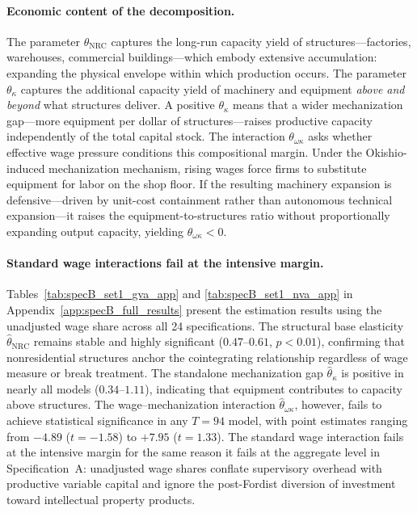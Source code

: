\paragraph{Economic content of the decomposition.}
The parameter $\theta_{\text{NRC}}$ captures the long-run capacity yield of structures---factories, warehouses, commercial buildings---which embody extensive accumulation: expanding the physical envelope within which production occurs. The parameter $\theta_\kappa$ captures the additional capacity yield of machinery and equipment \emph{above and beyond} what structures deliver. A positive $\theta_\kappa$ means that a wider mechanization gap---more equipment per dollar of structures---raises productive capacity independently of the total capital stock. The interaction $\theta_{\omega\kappa}$ asks whether effective wage pressure conditions this compositional margin. Under the Okishio-induced mechanization mechanism, rising wages force firms to substitute equipment for labor on the shop floor. If the resulting machinery expansion is defensive---driven by unit-cost containment rather than autonomous technical expansion---it raises the equipment-to-structures ratio without proportionally expanding output capacity, yielding $\theta_{\omega\kappa} < 0$.

\paragraph{Standard wage interactions fail at the intensive margin.}
Tables~\ref{tab:specB_set1_gva_app} and \ref{tab:specB_set1_nva_app} in Appendix~\ref{app:specB_full_results} present the estimation results using the unadjusted wage share across all 24 specifications. The structural base elasticity $\hat{\theta}_{\text{NRC}}$ remains stable and highly significant ($0.47$--$0.61$, $p < 0.01$), confirming that nonresidential structures anchor the cointegrating relationship regardless of wage measure or break treatment. The standalone mechanization gap $\hat{\theta}_\kappa$ is positive in nearly all models ($0.34$--$1.11$), indicating that equipment contributes to capacity above structures. The wage--mechanization interaction $\hat{\theta}_{\omega\kappa}$, however, fails to achieve statistical significance in any $T = 94$ model, with point estimates ranging from $-4.89$ ($t = -1.58$) to $+7.95$ ($t = 1.33$). The standard wage interaction fails at the intensive margin for the same reason it fails at the aggregate level in Specification~A: unadjusted wage shares conflate supervisory overhead with productive variable capital and ignore the post-Fordist diversion of investment toward intellectual property products.

